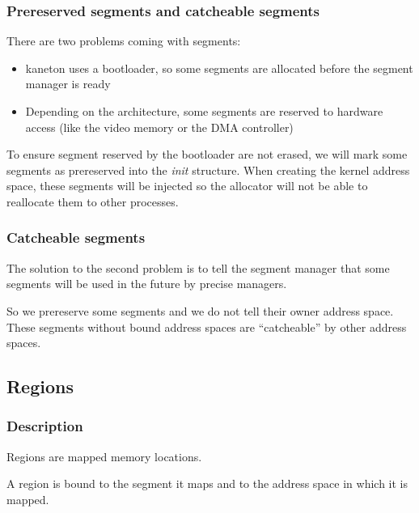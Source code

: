 
\begin{frame}
  \frametitle{Prereserved segments and catcheable segments}

  There are two problems coming with segments:

  \begin{itemize}
  \item kaneton uses a bootloader, so some segments are allocated before the segment manager is ready
  \item Depending on the architecture, some segments are reserved to hardware access (like the video memory or the DMA controller)
  \end{itemize}

  \nl

  To ensure segment reserved by the bootloader are not erased, we will
  mark   some   segments   as   prereserved   into   the   \emph{init}
  structure. When  creating the  kernel address space,  these segments
  will be  injected so  the allocator will  not be able  to reallocate
  them to other processes.

\end{frame}


\begin{frame}
  \frametitle{Catcheable segments}

  The solution  to the second problem  is to tell  the segment manager
  that some segments will be used in the future by precise managers.

  \nl

  So  we prereserve  some  segments and  we  do not  tell their  owner
  address  space.  These segments  without  bound  address spaces  are
  ``catcheable'' by other address spaces.

\end{frame}

%
%

\subsection{Regions}


\begin{frame}
  \frametitle{Description}

  Regions are mapped memory locations.

  \nl

  A region is bound to the segment it maps and to the address space in
  which it is mapped.

\end{frame}

